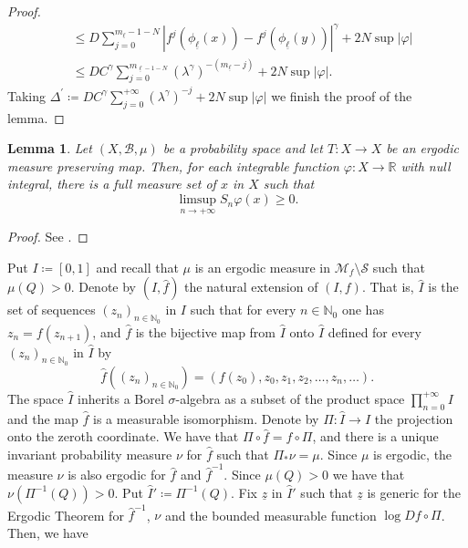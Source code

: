 \documentclass[12pt]{amsart}
\numberwithin{equation}{section} %
\numberwithin{figure}{section} %
\theoremstyle{plain}
\newtheorem{lemm}[prop]{Lemma}
\theoremstyle{definition}
\theoremstyle{remark}
\theoremstyle{citing}
\newcommand{\N}{\mathbb{N}}
\newcommand{\R}{\mathbb{R}}
\newcommand{\sB}{\mathscr{B}}
\renewcommand{\=}{\coloneqq}
\begin{document}
\begin{proof}
\begin{equation*}
\begin{split}
            &\leq D\sum_{j=0}^{m_{\underline{\ell}}-1-N}|f^{j}(\phi_{\underline{\ell}}(x)) - f^j(\phi_{\underline{\ell}}(y))|^{\gamma} + 2N\sup |\varphi|\\
            &\leq DC^\gamma \sum_{j=0}^{m_{\underline{\ell}-1-N}} (\lambda^{\gamma})^{-(m_{{\underline{\ell}}}-j)} + 2N\sup|\varphi|.
            \end{split}
        \end{equation*}
        Taking $\Delta^{'} \= DC^{\gamma} \sum_{j=0}^{+\infty} (\lambda^{\gamma})^{-j}  + 2N\sup |\varphi|$ we finish the proof of the lemma.
    \end{proof}
    \begin{lemm}\label{lemma 4 key lemma}
        Let $(X,\sB,\mu)$ be a probability space and let $T\colon X\to X$ be an ergodic measure preserving map. Then, for each integrable function $\varphi\colon X\to\R$ with null integral, there is a full measure set of $x$ in $X$ such that
        \begin{equation}
            \limsup_{n\to+\infty} S_n\varphi(x) \geq 0.
        \end{equation}
    \end{lemm}
    \begin{proof}
        See \cite[Lemma A.4]{coronelRivera1}.
    \end{proof}
    Put $I\=[0,1]$ and recall that $\mu$ is an ergodic measure in $\mathcal{M}_f\setminus \mathcal{S}$  such that $\mu(Q)>0$. Denote by $(\widehat{I},\widehat{f})$ the natural extension of $(I,f)$. That is, $\widehat{I}$ is the set of sequences $(z_n)_{n\in\N_0}$ in $I$ such that for every $n\in \N_0$ one has $z_n=f(z_{n+1})$, and $\widehat{f}$ is the bijective map from $\widehat{I}$ onto $\widehat{I}$ defined for every $(z_n)_{n\in\N_0}$ in $\widehat{I}$ by
    \begin{equation}
        \widehat{f}((z_n)_{n\in\N_0})= (f(z_0),z_0,z_1,z_2,\ldots,z_n,\ldots).
    \end{equation}
    The space $\widehat{I}$ inherits a Borel $\sigma$-algebra as a subset of the product space $\prod_{n=0}^{+\infty}I$ and the map $\widehat{f}$ is a measurable isomorphism. Denote by $\Pi\colon \widehat{I}\to I$ the projection onto the zeroth coordinate. We have that $\Pi\circ\widehat{f}= f\circ \Pi$, and there is a unique invariant probability measure $\nu$ for $\widehat{f}$ such that $\Pi_*\nu = \mu$. Since $\mu$ is ergodic, the measure $\nu$ is also ergodic for $\widehat{f}$ and $\widehat{f}^{-1}$. Since $\mu(Q)>0$ we have that $\nu(\Pi^{-1}(Q))>0$. Put $\widehat{I}'\=\Pi^{-1}(Q)$. Fix $\underline{z}$ in $\widehat{I}'$ such that $\underline{z}$ is generic for the Ergodic Theorem for $\widehat{f}^{-1}$, $\nu$ and the bounded measurable function $\log Df\circ \Pi$. Then, we have
\end{document}

